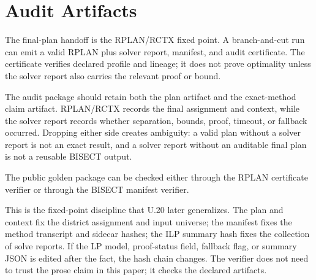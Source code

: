 \section{Audit Artifacts}

The final-plan handoff is the RPLAN/RCTX fixed point. A branch-and-cut run can
emit a valid RPLAN plus solver report, manifest, and audit certificate. The
certificate verifies declared profile and lineage; it does not prove optimality
unless the solver report also carries the relevant proof or bound.

The audit package should retain both the plan artifact and the exact-method
claim artifact. RPLAN/RCTX records the final assignment and context, while the
solver report records whether separation, bounds, proof, timeout, or fallback
occurred. Dropping either side creates ambiguity: a valid plan without a solver
report is not an exact result, and a solver report without an auditable final
plan is not a reusable BISECT output.

The public golden package can be checked either through the RPLAN certificate
verifier or through the BISECT manifest verifier.

This is the fixed-point discipline that U.20 later generalizes. The plan and
context fix the district assignment and input universe; the manifest fixes the
method transcript and sidecar hashes; the ILP summary hash fixes the collection
of solve reports. If the LP model, proof-status field, fallback flag, or
summary JSON is edited after the fact, the hash chain changes. The verifier
does not need to trust the prose claim in this paper; it checks the declared
artifacts.
